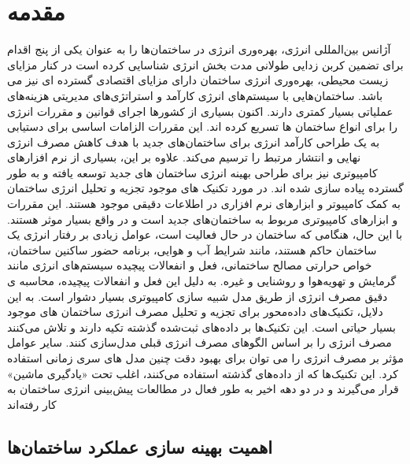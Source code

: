 \chapter{مقدمه}

آژانس بین‌المللی انرژی، بهره‌وری انرژی در ساختمان‌ها را به عنوان یکی از پنج اقدام برای تضمین کربن زدایی طولانی مدت بخش انرژی شناسایی کرده است\cite{DEB2017902}
در کنار مزایای زیست محیطی، بهره‌وری انرژی ساختمان دارای مزایای اقتصادی گسترده ای نیز می باشد. ساختمان‌هایی با سیستم‌های انرژی کارآمد و استراتژی‌های مدیریتی هزینه‌های عملیاتی بسیار کمتری دارند. اکنون بسیاری از کشورها اجرای قوانین و مقررات انرژی را برای انواع ساختمان ها تسریع کرده اند. این مقررات الزامات اساسی برای دستیابی به یک طراحی کارآمد انرژی برای ساختمان‌های جدید با هدف کاهش مصرف انرژی نهایی و انتشار  مرتبط را ترسیم می‌کند. علاوه بر این، بسیاری از نرم افزارهای کامپیوتری نیز برای طراحی بهینه انرژی ساختمان های جدید توسعه یافته و به طور گسترده پیاده سازی شده اند. در مورد تکنیک های موجود تجزیه و تحلیل انرژی ساختمان به کمک کامپیوتر و ابزارهای نرم افزاری در \cite{ALHOMOUD2001421, CRAWLEY2008661} اطلاعات دقیقی موجود هستند. این مقررات و ابزارهای کامپیوتری مربوط به ساختمان‌های جدید است و در واقع بسیار موثر هستند. با این حال، هنگامی که ساختمان در حال فعالیت است، عوامل زیادی بر رفتار انرژی یک ساختمان حاکم هستند، مانند شرایط آب و هوایی، برنامه حضور ساکنین ساختمان، خواص حرارتی مصالح ساختمانی، فعل و انفعالات پیچیده سیستم‌های انرژی مانند گرمایش و تهویه‌هوا و روشنایی و غیره. به دلیل این فعل و انفعالات پیچیده، محاسبه ی دقیق مصرف انرژی از طریق مدل شبیه سازی کامپیوتری بسیار دشوار است. به این دلایل، تکنیک‌های داده‌محور برای تجزیه و تحلیل مصرف انرژی ساختمان های موجود بسیار حیاتی است. این تکنیک‌ها بر داده‌های ثبت‌شده گذشته تکیه دارند و تلاش می‌کنند مصرف انرژی را بر اساس الگوهای مصرف انرژی قبلی مدل‌سازی کنند. سایر عوامل مؤثر بر مصرف انرژی را می توان برای بهبود دقت چنین مدل های سری زمانی استفاده کرد. این تکنیک‌ها که از داده‌های گذشته استفاده می‌کنند، اغلب تحت «یادگیری ماشین» قرار می‌گیرند و در دو دهه اخیر به طور فعال در مطالعات پیش‌بینی انرژی ساختمان به کار رفته‌اند

\section[اهمیت بهینه سازی عملکرد ساختمان‌ها]{اهمیت بهینه سازی عملکرد ساختمان‌ها\cite{DEB2017902}}

